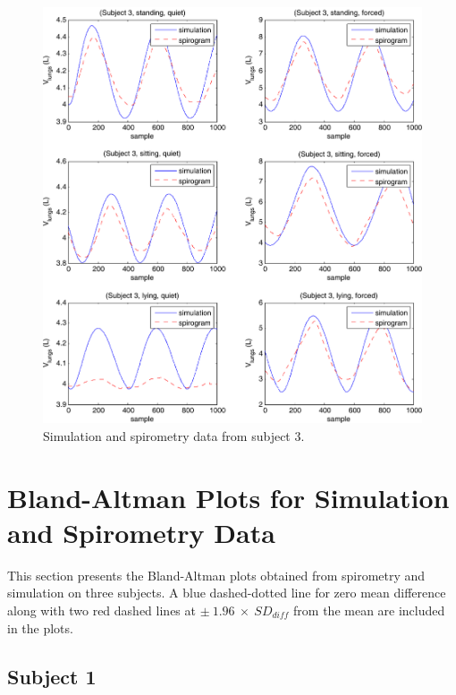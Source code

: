 \begin{figure}[H]
	\centering
	 \includegraphics[width=1\textwidth]{pics/to}
	\caption[Simulation and spirometry data from subject 3]{\label{appA:fig:p3}Simulation and spirometry data from subject 3.}
\end{figure}









\chapter{\label{appendixB}Bland-Altman Plots for Simulation and Spirometry Data}

This section presents the Bland-Altman plots obtained from spirometry and simulation on three subjects. 
A blue dashed-dotted line for zero mean difference along with two red dashed lines at $\pm~1.96~\times~SD_{diff}$ from the mean are included in the plots. 

\newpage
\section{\label{appendixB:p1}Subject 1}


